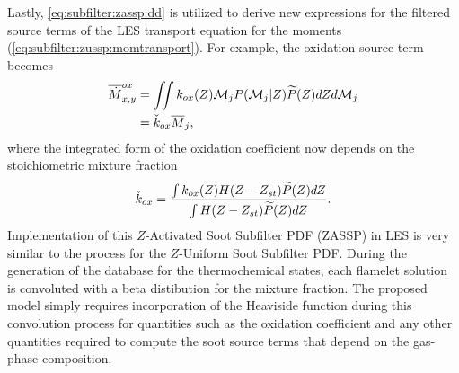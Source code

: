 Lastly, \cref{eq:subfilter:zassp:dd} is utilized to derive new expressions for the filtered source terms of the LES transport equation for the moments (\cref{eq:subfilter:zussp:momtransport}). For example, the oxidation source term becomes
\begin{equation}\label{eq:subfilter:zassp:ox}
  \begin{split}
    \fst[M]{x,y}^{ox} &= \iint k_{ox}(Z)\mc{M}_j P(\mc{M}_j|Z)\pz dZ d\mc{M}_j \\
    &= \check{k}_{ox}\mean{M}_j,
  \end{split}
\end{equation}
where the integrated form of the oxidation coefficient now depends on the stoichiometric mixture fraction
\begin{equation}\label{eq:subfilter:zassp:kox}
  \check{k}_{ox} = \frac{\int k_{ox}(Z)H(Z - Z_{st})\pz dZ}{\int H(Z - Z_{st})\pz dZ}.
\end{equation}
Implementation of this $Z$-Activated Soot Subfilter PDF (ZASSP) in LES is very similar to the process for the $Z$-Uniform Soot Subfilter PDF. During the generation of the database for the thermochemical states, each flamelet solution is convoluted with a beta distibution for the mixture fraction. The proposed model simply requires incorporation of the Heaviside function during this convolution process for quantities such as the oxidation coefficient and any other quantities required to compute the soot source terms that depend on the gas-phase composition. 

